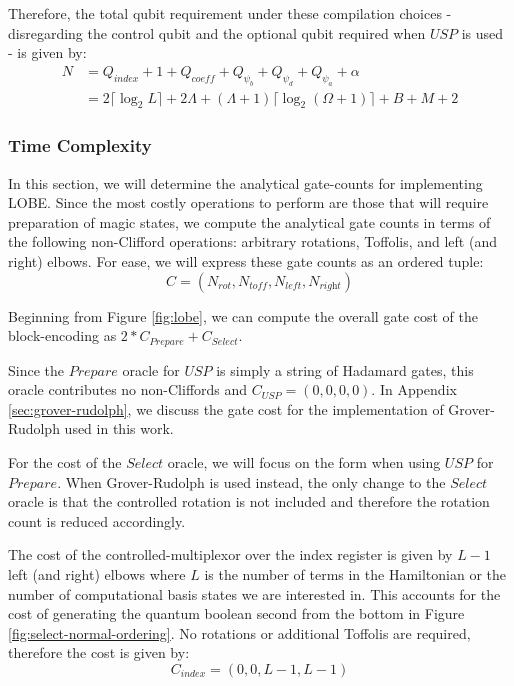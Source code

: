 Therefore, the total qubit requirement under these compilation choices - disregarding the control qubit and the optional qubit required when $USP$ is used - is given by:
\begin{equation}
    \begin{split}
        N &= Q_{\textit{index}} + 1 + Q_{\textit{coeff}} + Q_{\psi_b} + Q_{\psi_d} + Q_{\psi_a} + \alpha \\
        &= 2 \lceil \log_2{L} \rceil + 2 \Lambda + (\Lambda + 1) \lceil \log_2{(\Omega + 1)} \rceil + B + M + 2
    \end{split}
\end{equation}


\subsubsection{Time Complexity}

In this section, we will determine the analytical gate-counts for implementing LOBE.
Since the most costly operations to perform are those that will require preparation of magic states, we compute the analytical gate counts in terms of the following non-Clifford operations: arbitrary rotations, Toffolis, and left (and right) elbows.
For ease, we will express these gate counts as an ordered tuple:
\begin{equation}
    C = (N_{\textit{rot}}, N_{\textit{toff}}, N_{\textit{left}}, N_{\textit{right}})
\end{equation}

Beginning from Figure \ref{fig:lobe}, we can compute the overall gate cost of the block-encoding as $2*C_{\textit{Prepare}} + C_{\textit{Select}}$.

Since the $\textit{Prepare}$ oracle for $USP$ is simply a string of Hadamard gates, this oracle contributes no non-Cliffords and $C_{\textit{USP}} = (0, 0, 0, 0)$.
In Appendix \ref{sec:grover-rudolph}, we discuss the gate cost for the implementation of Grover-Rudolph used in this work. 

For the cost of the $\textit{Select}$ oracle, we will focus on the form when using $USP$ for $\textit{Prepare}$.
When Grover-Rudolph is used instead, the only change to the $\textit{Select}$ oracle is that the controlled rotation is not included and therefore the rotation count is reduced accordingly.  

The cost of the controlled-multiplexor over the index register is given by $L - 1$ left (and right) elbows \cite{babbush2018encoding} where $L$ is the number of terms in the Hamiltonian or the number of computational basis states we are interested in.
This accounts for the cost of generating the quantum boolean second from the bottom in Figure \ref{fig:select-normal-ordering}.
No rotations or additional Toffolis are required, therefore the cost is given by: 
\begin{equation}
    C_{\textit{index}} = (0, 0, L-1, L-1)
\end{equation}

